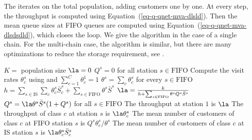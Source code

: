 The  iterates on the
total population, adding customers one by one. At
every step, the throughput is computed using
Equation~(\ref{eq-q-qnet-mva-dlsld}). Then the
mean queue sizes at FIFO queues are computed
using Equation~(\ref{eq-q-qnet-mva-dlsdsdld}),
which closes the loop. We give the algorithm in
the case of a single chain. For the multi-chain
case, the algorithm is similar, but there are
many optimizations to reduce the storage
requirement, see \cite{balsamo2000product}.
%
 \begin{algorithm}
 \begin{algorithmic}[1]
%
  \State $K=$ population size
  \State $\la=0$ 
  \State $Q^s=0$ for all station $s \in \mathrm{FIFO}$
%
  \State Compute the visit rates $\theta^s_c$
  using  and
  $\sum_{c=1}^C\theta^1_c=1$
  \State $\theta^s=\sum_{c}\theta^s_c$ for every
  $s\in \mathrm{FIFO}$
  \State $h=\sum_{s \in \mathrm{IS}}\sum_{c}\theta^s_c
  \bar{S}^s_c  + \sum_{s \in
  \mathrm{FIFO}}\theta^s  \bar{S}^s$
%
    \State
    $\la=\frac{k}{h+\sum_{s \in \mathrm{FIFO}}
    \theta^s  Q^s \bar{S}^s}$
    \State $Q^s=\la \theta^s
    \bar{S}^s (1 + Q^s)$ for all
    $s \in \mathrm{FIFO}$
  \EndFor
  \State The throughput at station $1$ is $\la$
  \State The throughput of class $c$ at station $s$ is $\la
 \theta^s_c$
  \State The mean number of customers of class $c$ at FIFO
  station
  $s$ is $Q^s\theta^s_c/\theta^s$
  \State The mean number of customers of class $c$ at
  IS
  station
  $s$ is $\la \theta^s_c \bar{S}^s_c$
\end{algorithmic}\label{algo-q-mva}
 \end{algorithm}
\begin{figure}[htbp]
\end{figure}


